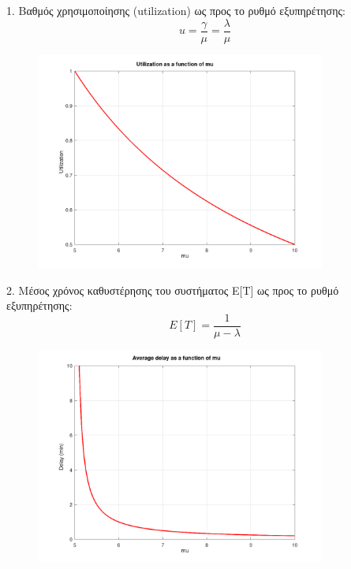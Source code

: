 \documentclass[a4paper]{article}
\begin{document}
\begin{minipage}{\textwidth}
	1. Βαθμός χρησιμοποίησης (utilization) ως προς το ρυθμό εξυπηρέτησης:
	\[
		u = \frac{γ}{μ} = \frac{λ}{μ}
	\]	
	\begin{figure}[H]
		\begin{center}
			\includegraphics[width=0.85\textwidth]{files/2b1.png}
		\end{center}
	\end{figure}
\end{minipage}

\begin{minipage}{\textwidth}
	2. Μέσος χρόνος καθυστέρησης του συστήματος E[T] ως προς το ρυθμό εξυπηρέτησης:
	\[
		E[T] = \frac{1}{μ-λ}
	\]
	\begin{figure}[H]
		\begin{center}
			\includegraphics[width=0.85\textwidth]{files/2b2.png}
		\end{center}
	\end{figure}
\end{minipage}
\end{document}
